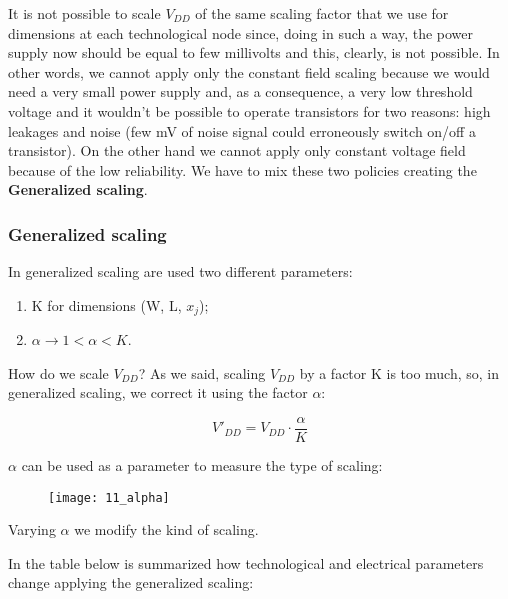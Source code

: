 \documentclass[a4paper, 12pt, twoside, openright]{report}
\begin{document}
{{{{It is not possible to scale $V_{DD}$ of the same scaling factor that we use for dimensions at each technological node since, doing in such a way, the power supply now should be equal to few millivolts and this, clearly, is not possible. In other words, we cannot apply only the constant field scaling because we would need a very small power supply and, as a consequence, a very low threshold voltage and it wouldn't be possible to operate transistors for two reasons: high leakages and noise (few mV of noise signal could erroneously switch on/off a transistor). On the other hand we cannot apply only constant voltage field because of the low reliability. We have to mix these two policies creating the \textbf{Generalized scaling}.

\subsubsection{Generalized scaling}

In generalized scaling are used two different parameters:

	\begin{enumerate}
	\item K for dimensions (W, L, $x_{j}$);
	\item $\alpha \rightarrow 1< \alpha < K$.  
	\end{enumerate}

How do we scale $V_{DD}$? As we said, scaling $V_{DD}$ by a factor K is too much, so, in generalized scaling, we correct it using the factor $\alpha$:

	\begin{equation}
	V'_{DD} = V_{DD} \cdot \frac{\alpha}{K}
	\end{equation}

$\alpha$ can be used as a parameter to measure the type of scaling:

	\begin{figure}[H]
	\centering
	\texttt{[image: 11\_alpha]}
	\caption{}
	\label{}
	\end{figure}

Varying $\alpha$ we modify the kind of scaling.

In the table below is summarized how technological and electrical parameters change applying the generalized scaling:

\newpage

}}}}
\end{document}
